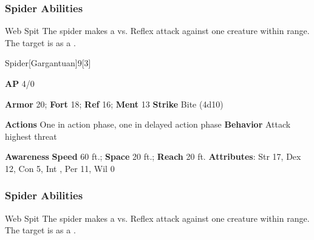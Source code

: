 \subsubsection{Spider Abilities}

\begin{freeability}{Web Spit}
The spider makes a  vs. Reflex attack against one creature within \rnglong range.
\hit The target is  as a .
\end{freeability}

\begin{monsection}{Spider}[Gargantuan]{9}[3]
\vspace{-1em}\vspace{-1em}
\begin{spellcontent}
\begin{spelltargetinginfo}
{\textbf{AP} 4/0}

\pari \textbf{Armor} 20;
\textbf{Fort} 18;
\textbf{Ref} 16;
\textbf{Ment} 13
\pari \textbf{Strike} Bite  (4d10)


\pari \textbf{Actions} One in action phase, one in delayed action phase
\pari \textbf{Behavior} Attack highest threat
\end{spelltargetinginfo}
\end{spellcontent}

\begin{monsterfooter}
\pari \textbf{Awareness} 
\pari \textbf{Speed} 60 ft.;
\textbf{Space} 20 ft.;
\textbf{Reach} 20 ft.
\pari \textbf{Attributes}:
Str 17,
Dex 12,
Con 5,
Int ,
Per 11,
Wil 0
\end{monsterfooter}
\end{monsection}


\subsubsection{Spider Abilities}

\begin{freeability}{Web Spit}
The spider makes a  vs. Reflex attack against one creature within \rnglong range.
\hit The target is  as a .
\end{freeability}

